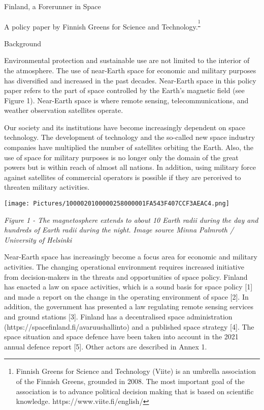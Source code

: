 \protect\hypertarget{anchor-7}{}{}Finland, a Forerunner in Space

A policy paper by Finnish Greens for Science and
Technology.\textsuperscript{\footnote{Finnish Greens for Science and
  Technology (Viite) is an umbrella association of the Finnish Greens,
  grounded in 2008. The most important goal of the association is to
  advance political decision making that is based on scientific
  knowledge. https://www.viite.fi/english/}}

\protect\hypertarget{anchor-8}{}{}Background

Environmental protection and sustainable use are not limited to the
interior of the atmosphere. The use of near-Earth space for economic and
military purposes has diversified and increased in the past decades.
Near-Earth space in this policy paper refers to the part of space
controlled by the Earth's magnetic field (see Figure 1). Near-Earth
space is where remote sensing, telecommunications, and weather
observation satellites operate.

Our society and its institutions have become increasingly dependent on
space technology. The development of technology and the so-called new
space industry companies have multiplied the number of satellites
orbiting the Earth. Also, the use of space for military purposes is no
longer only the domain of the great powers but is within reach of almost
all nations. In addition, using military force against satellites of
commercial operators is possible if they are perceived to threaten
military activities.

\texttt{[image: Pictures/1000020100000258000001FA543F407CCF3AEAC4.png]}

\protect\hypertarget{anchor-9}{}{}\emph{Figure 1 - The magnetosphere
extends to about 10 Earth radii during the day and hundreds of Earth
radii during the night. Image source Minna Palmroth / University of
Helsinki}

Near-Earth space has increasingly become a focus area for economic and
military activities. The changing operational environment requires
increased initiative from decision-makers in the threats and
opportunities of space policy. Finland has enacted a law on space
activities, which is a sound basis for space policy {[}1{]} and made a
report on the change in the operating environment of space {[}2{]}. In
addition, the government has presented a law regulating remote sensing
services and ground stations {[}3{]}. Finland has a decentralised space
administration (https://spacefinland.fi/avaruushallinto) and a published
space strategy {[}4{]}. The space situation and space defence have been
taken into account in the 2021 annual defence report {[}5{]}. Other
actors are described in Annex 1.


